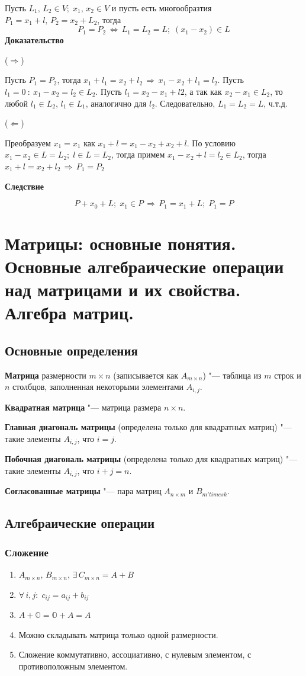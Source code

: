 \documentclass{article}
\begin{document}
Пусть $L_1,\,L_2\in V;\;x_1,\,x_2\in V$ и пусть есть многообразтия $P_1=x_1+l,\,P_2=x_2+L_2$, тогда
$$ P_1=P_2\,\Leftrightarrow\,L_1=L_2=L;\;(x_1-x_2)\in L $$
\textbf{Доказательство}

($\Rightarrow$)

Пусть $P_1=P_2$, тогда $x_1+l_1=x_2+l_2\,\Rightarrow\,x_1-x_2+l_1=l_2$. Пусть $l_1=0\::\:x_1-x_2=l_2\in L_2$. Пусть $l_1=x_2-x_1+l2$, а так как $x_2-x_1\in L_2$, то любой $l_1\in L_2,\,l_1\in L_1$, аналогично для $l_2$. Следовательно, $L_1=L_2=L$, ч.т.д.

($\Leftarrow$)

Преобразуем $x_1=x_1$ как $x_1+l=x_1-x_2+x_2+l$. По условию $x_1-x_2\in L=L_2;\;l\in L= L_2$, тогда примем $x_1-x_2+l=l_2\in L_2$, тогда $x_1+l=x_2+l_2\,\Rightarrow\,P_1=P_2$

\textbf{Следствие}

$$ P+x_0+L;\;x_1\in P\,\Rightarrow\,P_1=x_1+L;\;P_1=P $$

\newpage
\section{Матрицы: основные понятия. Основные алгебраические операции над матрицами и их свойства. Алгебра матриц.}

\subsection{Основные определения}
\textbf{Матрица} размерности $m \times n$ (записывается как $A_{m\times n}$) "--- таблица из $m$ строк и $n$ столбцов, заполненная некоторыми элементами $A_{i, j}$.

\textbf{Квадратная матрица} "--- матрица размера $n\times n$.

\textbf{Главная диагональ матрицы} (определена только для квадратных матриц) "--- такие элементы $A_{i, j}$, что $i = j$.

\textbf{Побочная диагональ матрицы} (определена только для квадратных матриц) "--- такие элементы $A_{i, j}$, что $i + j = n$.

\textbf{Согласованные матрицы} "--- пара матриц $A_{n\times m}$ и $B_{m 'times k}$.

\subsection{Алгебраические операции}
\subsubsection{Сложение}
\begin{enumerate}
    \item $A_{m\times n},\,B_{m\times n},\,\exists\, C_{m\times n}=A+B$
    \item $\forall\,i,j:\;c_{ij}=a_{ij}+b_{ij}$
    \item $A+\mathbb{O}=\mathbb{O}+A=A$
    \item Можно складывать матрица только одной размерности.
    \item Сложение коммутативно, ассоциативно, с нулевым элементом, с противоположным элементом.
\end{enumerate}
\end{document}
